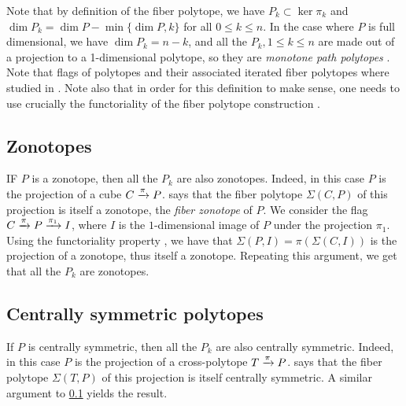 Note that by definition of the fiber polytope, we have $P_k \subset \ker \pi_k$ and $\dim P_k = \dim P - \min\{ \dim P,k\}$ for all $0\leq k \leq n$.
In the case where $P$ is full dimensional, we have $\dim P_k = n-k$, and all the $P_k, 1 \leq k \leq n$ are made out of a projection to a 1-dimensional polytope, so they are \emph{monotone path polytopes} \cite[Theorem 5.3]{BilleraSturmfels92}. 
Note that flags of polytopes and their associated iterated fiber polytopes where studied in \cite{BilleraSturmfels94}.
Note also that in order for this definition to make sense, one needs to use crucially the functoriality of the fiber polytope construction \cite[Lemma 2.3]{BilleraSturmfels92}.

\subsection{Zonotopes} \label{ss:zonotopes}

IF $P$ is a zonotope, then all the $P_k$ are also zonotopes.
Indeed, in this case $P$ is the projection of a cube $C \xrightarrow{\pi} P$.
\cite[Theorem 4.1]{BilleraSturmfels92} says that the fiber polytope $\Sigma(C,P)$ of this projection is itself a zonotope, the \emph{fiber zonotope} of $P$.
We consider the flag $C \xrightarrow{\pi} P \xrightarrow{\pi_1} I$, where $I$ is the $1$-dimensional image of $P$ under the projection $\pi_1$.
Using the functoriality property \cite[Lemma 2.3]{BilleraSturmfels92}, we have that $\Sigma(P,I)=\pi(\Sigma(C,I))$ is the projection of a zonotope, thus itself a zonotope.
Repeating this argument, we get that all the $P_k$ are zonotopes.

\subsection{Centrally symmetric polytopes} \label{ss:centrally-symmetric}

If $P$ is centrally symmetric, then all the $P_k$ are also centrally symmetric.
Indeed, in this case $P$ is the projection of a cross-polytope $T \xrightarrow{\pi} P$.
\cite[Theorem 5.1]{BilleraSturmfels92} says that the fiber polytope $\Sigma(T,P)$ of this projection is itself centrally symmetric.
A similar argument to \cref{ss:zonotopes} yields the result.


